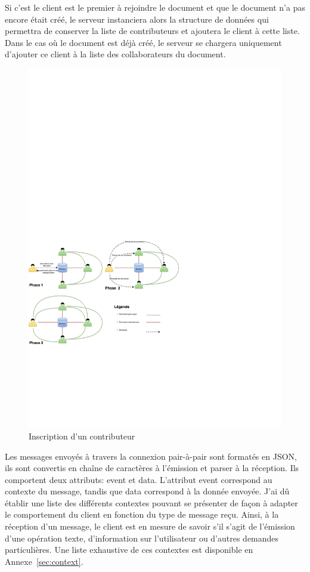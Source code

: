 \documentclass{tnreport}
\begin{document}
Si c'est le client est le premier à rejoindre le document et que le document n'a pas encore était créé, le serveur instanciera alors la structure de données qui permettra de conserver la liste de contributeurs et ajoutera le client à cette liste. Dans le cas où le document est déjà créé, le serveur se chargera uniquement d'ajouter ce client à la liste des collaborateurs du document. 

\begin{figure}[!h]
  \centering
  \includegraphics[width=15cm]{figures/inscription}
  \caption{Inscription d'un contributeur}
  \label{fig:inscription}
\end{figure}

Les messages envoyés à travers la connexion pair-à-pair sont formatés en JSON, ils sont convertis en chaîne de caractères à l'émission et parser à la réception. Ils comportent deux attributs: event et data. L'attribut event correspond au contexte du message, tandis que data correspond à la donnée envoyée. J'ai dû établir une liste des différents contextes pouvant se présenter de façon à adapter le comportement du client en fonction du type de message reçu. Ainsi, à la réception d'un message, le client est en mesure de savoir s'il s'agit de l'émission d'une opération texte, d'information sur l'utilisateur ou d'autres demandes particulières. Une liste exhaustive de ces contextes est disponible en Annexe~\ref{sec:context}.
\end{document}
